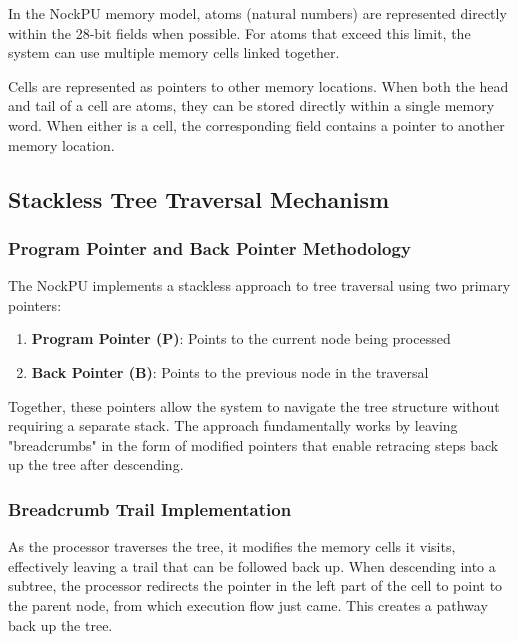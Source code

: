\documentclass[twoside]{article}
\begin{document}
In the NockPU memory model, atoms (natural numbers) are represented directly within the 28-bit fields when possible. For atoms that exceed this limit, the system can use multiple memory cells linked together.

Cells are represented as pointers to other memory locations. When both the head and tail of a cell are atoms, they can be stored directly within a single memory word. When either is a cell, the corresponding field contains a pointer to another memory location.

\subsection{Stackless Tree Traversal Mechanism}

\subsubsection{Program Pointer and Back Pointer Methodology}

The NockPU implements a stackless approach to tree traversal \citep{Burrows2009} using two primary pointers:

\begin{enumerate}
  \item \textbf{Program Pointer (P)}: Points to the current node being processed
  \item \textbf{Back Pointer (B)}: Points to the previous node in the traversal
\end{enumerate}

\noindent
Together, these pointers allow the system to navigate the tree structure without requiring a separate stack. The approach fundamentally works by leaving "breadcrumbs" in the form of modified pointers that enable retracing steps back up the tree after descending.

\subsubsection{Breadcrumb Trail Implementation}


As the processor traverses the tree, it modifies the memory cells it visits, effectively leaving a trail that can be followed back up. When descending into a subtree, the processor redirects the pointer in the left part of the cell to point to the parent node, from which execution flow just came. This creates a pathway back up the tree.
\end{document}
